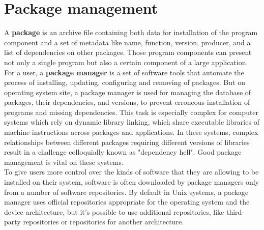 \section{Package management} \label{sec:pm}
A \textbf{package} is an archive file containing both data for installation of the program component and a set of metadata like name, function, version, producer, and a list of dependencies on other packages. 
Those program components can present not only a single program but also a certain component of a large application. %
For a user, a \textbf{package manager} is a set of software tools that automate the process of installing, updating, configuring and removing of packages.
But on operating system site, a package manager is used for managing the database of packages, their dependencies, and versions, to prevent erroneous installation of programs and missing dependencies.
This task is especially complex for computer systems which rely on dynamic library linking, which share executable libraries of machine instructions across packages and applications. 
In these systems, complex relationships between different packages requiring different versions of libraries result in a challenge colloquially known as "dependency hell".
Good package management is vital on these systems.\\
To give users more control over the kinds of software that they are allowing to be installed on their system, software is often downloaded by package managers only from a number of software repositories.
By default in Unix systems, a package manager uses official repositories appropriate for the operating system and the device architecture, but it's possible to use additional repositories, like third-party repositories or repositories for another architecture.\\
